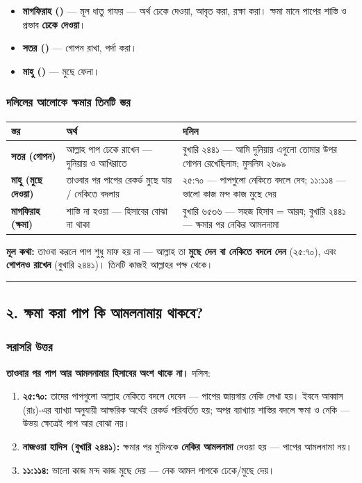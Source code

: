 \begin{itemize}
\item \textbf{মাগফিরাহ ()} — মূল ধাতু গাফর — অর্থ ঢেকে দেওয়া, আবৃত করা, রক্ষা করা। ক্ষমা মানে পাপের শাস্তি ও প্রভাব \textbf{ঢেকে দেওয়া}।
\item \textbf{সতর ()} — গোপন রাখা, পর্দা করা।
\item \textbf{মাহু ()} — মুছে ফেলা।
\end{itemize}
\subsubsection*{দলিলের আলোকে ক্ষমার তিনটি স্তর}

\begin{table}[h]\centering\small
\begin{tabular}{lll}
স্তর & অর্থ & দলিল \\
\hline
\textbf{সতর (গোপন)} & আল্লাহ পাপ ঢেকে রাখেন — দুনিয়ায় ও আখিরাতে & বুখারি ২৪৪১ — \lat{“}আমি দুনিয়ায় এগুলো তোমার উপর গোপন রেখেছিলাম\lat{”}; মুসলিম ২৬৯৯ \\
\textbf{মাহু (মুছে দেওয়া)} & তাওবার পর পাপের রেকর্ড মুছে যায় / নেকিতে বদলায় & ২৫:৭০ — \lat{“}পাপগুলো নেকিতে বদলে দেব\lat{”}; ১১:১১৪ — \lat{“}ভালো কাজ মন্দ কাজ মুছে দেয়\lat{”} \\
\textbf{মাগফিরাহ (ক্ষমা)} & শাস্তি না হওয়া — হিসাবের বোঝা না থাকা & বুখারি ৬৫৩৬ — সহজ হিসাব = আরয; বুখারি ২৪৪১ — ক্ষমার পর নেকির আমলনামা \\
\hline
\end{tabular}
\end{table}

\textbf{মূল কথা:} তাওবা করলে পাপ শুধু মাফ হয় না — আল্লাহ তা \textbf{মুছে দেন বা নেকিতে বদলে দেন} (২৫:৭০), এবং \textbf{গোপনও রাখেন} (বুখারি ২৪৪১)। তিনটি কাজই আল্লাহর পক্ষ থেকে।

\medskip\hrule\medskip

\subsection*{২. ক্ষমা করা পাপ কি আমলনামায় থাকবে?}

\subsubsection*{সরাসরি উত্তর}

\textbf{তাওবার পর পাপ আর আমলনামার হিসাবের অংশ থাকে না।} দলিল:

\begin{enumerate}
\item \textbf{২৫:৭০:} তাদের পাপগুলো আল্লাহ নেকিতে বদলে দেবেন — পাপের জায়গায় নেকি লেখা হয়। ইবনে আব্বাস (রাঃ)-এর ব্যাখ্যা অনুযায়ী আক্ষরিক অর্থেই রেকর্ড পরিবর্তিত হয়; অপর ব্যাখ্যায় শাস্তির বদলে ক্ষমা ও নেকি — উভয় ক্ষেত্রেই পাপ আর বোঝা নয়।
\item \textbf{নাজওয়া হাদিস (বুখারি ২৪৪১):} ক্ষমার পর মুমিনকে \textbf{নেকির আমলনামা} দেওয়া হয় — পাপের আমলনামা নয়।
\item \textbf{১১:১১৪:} ভালো কাজ মন্দ কাজ মুছে দেয় — নেক আমল পাপকে ঢেকে/মুছে দেয়।
\end{enumerate}
